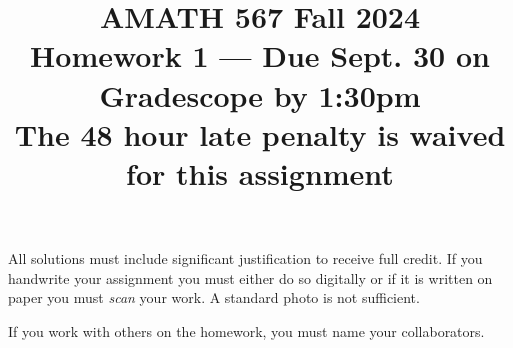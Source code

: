 \documentclass[10pt]{amsart}
\theoremstyle{nonumberplain}
\begin{document}
\pagestyle{empty}

\newcommand{\mline}{\vspace{.2in}\hrule\vspace{.2in}}


\title{\bf { AMATH 567 Fall 2024 \\ Homework 1 ---
    Due Sept. 30 on Gradescope by 1:30pm\\
  The 48 hour late penalty is waived for this assignment} }


\maketitle

\begin{center}
  All solutions must include significant justification to receive full credit.  If you handwrite your assignment you must either do so digitally or if it is written on paper you must \emph{scan} your work.  A standard photo is not sufficient.  \vskip 4pt

  If you work with others on the homework, you must name your collaborators.
\end{center}
\end{document}
